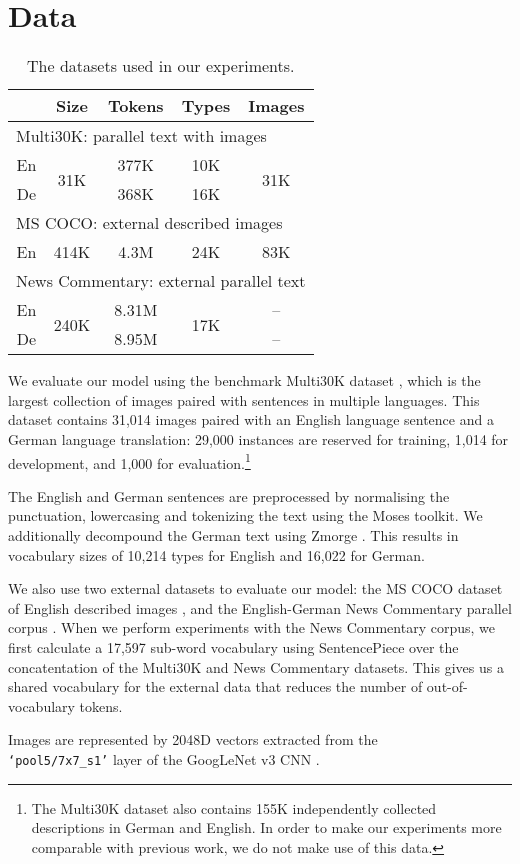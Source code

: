 \section{Data}\label{sec:data}

\begin{table}
\renewcommand{\arraystretch}{1.3}
\centering
\begin{tabular}{ccccc}
\toprule
& Size & Tokens & Types & Images\\
\midrule
\multicolumn{5}{l}{Multi30K: parallel text with images}\\
En & \multirow{2}{*}{31K} & 377K & 10K & \multirow{2}{*}{31K}\\
De & & 368K & 16K & \\
\midrule
\multicolumn{5}{l}{MS COCO: external described images}\\
En    & 414K & 4.3M & 24K & 83K \\
\midrule
\multicolumn{5}{l}{News Commentary: external parallel text}\\
En   & \multirow{2}{*}{240K} & 8.31M & \multirow{2}{*}{17K} &  --\\
De   & & 8.95M & & --\\
\bottomrule
\end{tabular}
\caption{The datasets used in our experiments.}\label{tab:datasets}
\end{table}

We evaluate our model using the benchmark Multi30K dataset \citep{ElliottFrankSimaanSpecia2016}, which is the largest collection of images paired with sentences in multiple languages. This dataset contains 31,014 images paired with an English language sentence and a German language translation: 29,000 instances are reserved for training, 1,014 for development, and 1,000 for evaluation.\footnote{The Multi30K dataset also contains 155K independently collected descriptions in German and English. In order to make our experiments more comparable with previous work, we do not make use of this data.}

The English and German sentences are preprocessed by normalising the punctuation, lowercasing and tokenizing the text using the Moses toolkit. We additionally decompound the German text  using Zmorge \cite{Sennrich2014}. This results in vocabulary sizes of 10,214 types for English and 16,022 for German.

We also use two external datasets to evaluate our model: the MS COCO dataset of English described images \cite{Chen2015}, and the English-German News Commentary parallel corpus \citep{Tiedemann2012}. When we perform experiments with the News Commentary corpus, we first calculate a 17,597 sub-word vocabulary using SentencePiece \citep{Schuster2012} over the concatentation of the Multi30K and News Commentary datasets. This gives us a shared vocabulary for the external data that reduces the number of out-of-vocabulary tokens. 

Images are represented by 2048D vectors extracted from the  \\ \texttt{`pool5/7x7\_s1'} 
layer of the GoogLeNet v3 CNN \citep{Szegedy2015}.